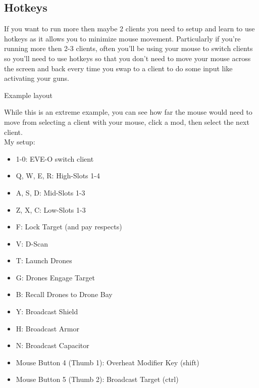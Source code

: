 \documentclass{article}
\begin{document}
\clearpage
\subsection{Hotkeys}

If you want to run more then maybe 2 clients you need to setup and learn to use hotkeys as it allows you 
to minimize mouse movement. Particularly if you're running more then 2-3 clients, often you'll be using your
mouse to switch clients so you'll need to use hotkeys so that you don't need to move your mouse across the
screen and back every time you swap to a client to do some input like activating your guns.
\\
\begin{center}
Example layout
\end{center}
While this is an extreme example, you can see how far the mouse would need to move from selecting a client with your mouse,
click a mod, then select the next client. \\

\noindent My setup: \\

\begin{itemize}
  \item 1-0: EVE-O switch client
  \item Q, W, E, R: High-Slots 1-4
  \item A, S, D: Mid-Slots 1-3
  \item Z, X, C: Low-Slots 1-3
  \item F: Lock Target (and pay respects)
  \item V: D-Scan
  \item T: Launch Drones
  \item G: Drones Engage Target
  \item B: Recall Drones to Drone Bay
  \item Y: Broadcast Shield
  \item H: Broadcast Armor
  \item N: Broadcast Capacitor
  \item Mouse Button 4 (Thumb 1): Overheat Modifier Key (shift)
  \item Mouse Button 5 (Thumb 2): Broadcast Target (ctrl)
\end{itemize}
\end{document}
